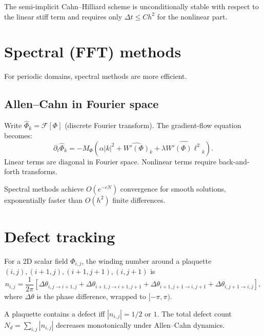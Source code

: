 \begin{proposition}
  \label{prop:si-ch}
  The semi-implicit Cahn--Hilliard scheme is unconditionally
  stable with respect to the linear stiff term and requires
  only $\Delta t \leq C h^2$ for the nonlinear part.
\end{proposition}

\section{Spectral (FFT) methods}

For periodic domains, spectral methods are more efficient.

\subsection*{Allen--Cahn in Fourier space}

Write $\hat\Phi_k = \mathcal{F}[\Phi]$ (discrete Fourier transform).
The gradient-flow equation becomes:
\[
  \partial_t\hat\Phi_k
  = -M_\Phi\!\left(\alpha|k|^2 + \hat{W'(\Phi)}_k
    + \lambda\widehat{W'(\Phi)\ell^2}_k\right).
\]
Linear terms are diagonal in Fourier space.
Nonlinear terms require back-and-forth transforms.

\begin{proposition}
  Spectral methods achieve $O(e^{-cN})$ convergence for smooth
  solutions, exponentially faster than $O(h^2)$ finite differences.
\end{proposition}

\section{Defect tracking}

\begin{definition}
  For a 2D scalar field $\Phi_{i,j}$, the winding number
  around a plaquette $(i,j),(i+1,j),(i+1,j+1),(i,j+1)$ is
  \[
    n_{i,j}
    = \frac{1}{2\pi}\left[
      \Delta\theta_{i,j\to i+1,j}
      + \Delta\theta_{i+1,j\to i+1,j+1}
      + \Delta\theta_{i+1,j+1\to i,j+1}
      + \Delta\theta_{i,j+1\to i,j}
    \right],
  \]
  where $\Delta\theta$ is the phase difference, wrapped to $[-\pi,\pi)$.
\end{definition}

\begin{proposition}
  \label{prop:defect-detect}
  A plaquette contains a defect iff $|n_{i,j}| = 1/2$ or $1$.
  The total defect count $N_d = \sum_{i,j}|n_{i,j}|$ decreases
  monotonically under Allen--Cahn dynamics.
\end{proposition}


